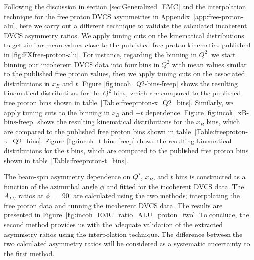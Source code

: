 Following the discussion in section \ref{sec:Generalized_EMC} and the 
interpolation technique for the free proton DVCS asymmetries in 
Appendix~\ref{app:free-proton-alu}, here we carry out a different technique to 
validate the calculated incoherent DVCS asymmetry ratios. We apply tuning cuts 
on the kinematical distributions to get similar mean values close to the 
published free proton kinematics published in \ref{fig:FXfree-proton-alu}. For 
instance, regarding the binning in $Q^2$, we start binning our incoherent DVCS 
data into four bins in $Q^2$ with mean values similar to the published free 
proton values, then we apply tuning cuts on the associated distributions in 
$x_B$ and $t$. Figure \ref{fig:incoh_Q2-bins-freep} shows the resulting 
kinematical distributions for the $Q^2$ bins, which are compared to the 
published free proton bins shown in table~\ref{Table:freeproton-x_Q2_bins}.  
Similarly, we apply tuning cuts to the binning in $x_B$ and $-t$ dependence.  
Figure \ref{fig:incoh_xB-bins-freep} shows the resulting kinematical 
distributions for the $x_B$ bins, which are compared to the published free 
proton bins shown in table~\ref{Table:freeproton-x_Q2_bins}. Figure 
\ref{fig:incoh_t-bins-freep} shows the resulting kinematical distributions for 
the $t$ bins, which are compared to the published free proton bins shown in 
table~\ref{Table:freeproton-t_bins}.

The beam-spin asymmetry dependence on $Q^2$, $x_B$, and $t$ bins is constructed 
as a function of the azimuthal angle $\phi$ and fitted for the incoherent DVCS 
data. The $A_{LU}$ ratios at $\phi$~=~90$^{\circ}$ are calculated using the two 
methods; interpolating the free proton data and tunning the incoherent DVCS 
data. The results are presented in 
Figure~\ref{fig:incoh_EMC_ratio_ALU_proton_two}. To conclude, the second method 
provides us with the adequate validation of the extracted asymmetry ratios 
using the interpolation technique. The difference between the two calculated 
asymmetry ratios will be considered as a systematic uncertainty to the first 
method.



